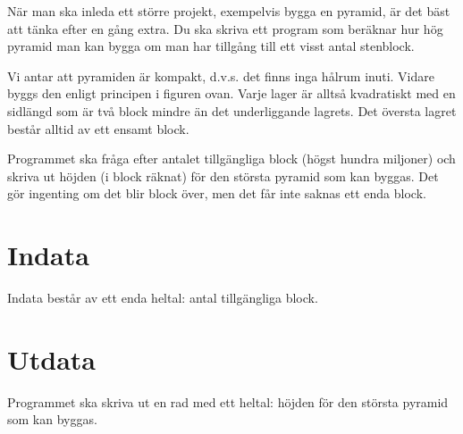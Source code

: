 När man ska inleda ett större projekt, exempelvis bygga en pyramid, är det bäst att tänka efter en gång extra.
Du ska skriva ett program som beräknar hur hög pyramid man kan bygga om man har tillgång till ett visst antal stenblock.

Vi antar att pyramiden är kompakt, d.v.s. det finns inga hålrum inuti.
Vidare byggs den enligt principen i figuren ovan.
Varje lager är alltså kvadratiskt med en sidlängd som är två block mindre än det underliggande lagrets.
Det översta lagret består alltid av ett ensamt block.

Programmet ska fråga efter antalet tillgängliga block (högst hundra miljoner) och skriva ut höjden (i block räknat) för den största pyramid som kan byggas.
Det gör ingenting om det blir block över, men det får inte saknas ett enda block.

\section*{Indata}
Indata består av ett enda heltal: antal tillgängliga block.

\section*{Utdata}
Programmet ska skriva ut en rad med ett heltal: höjden för den största pyramid som kan byggas.

